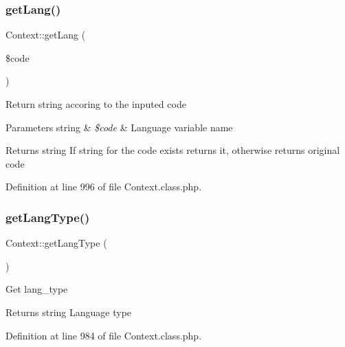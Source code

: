 \mbox{\label{classContext_a9af9269b04542f7462d27a63226e0ff3}} 
\subsubsection{\texorpdfstring{get\+Lang()}{getLang()}}
{\footnotesize\ttfamily Context\+::get\+Lang (\begin{DoxyParamCaption}\item[{}]{\$code }\end{DoxyParamCaption})}

Return string accoring to the inputed code


\begin{DoxyParams}[1]{Parameters}
string & {\em \$code} & Language variable name \\
\hline
\end{DoxyParams}
\begin{DoxyReturn}{Returns}
string If string for the code exists returns it, otherwise returns original code 
\end{DoxyReturn}


Definition at line 996 of file Context.\+class.\+php.

\mbox{\label{classContext_ae75d6f4064d09e48d0d76614b6997e29}} 
\subsubsection{\texorpdfstring{get\+Lang\+Type()}{getLangType()}}
{\footnotesize\ttfamily Context\+::get\+Lang\+Type (\begin{DoxyParamCaption}{ }\end{DoxyParamCaption})}

Get lang\+\_\+type

\begin{DoxyReturn}{Returns}
string Language type 
\end{DoxyReturn}


Definition at line 984 of file Context.\+class.\+php.

\mbox{\label{classContext_a8ee4ad4396e92a54d2aa7d079771619f}} 
